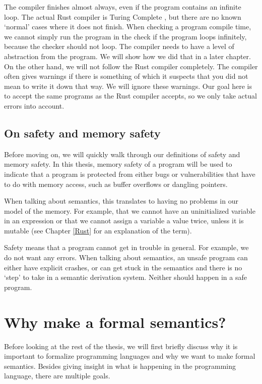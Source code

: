 The compiler finishes almost always, even if the program contains an infinite loop. The actual Rust compiler is Turing Complete \citep{compiler}, but there are no known `normal' cases where it does not finish. When checking a program compile time, we cannot simply run the program in the check if the program loops infinitely, because the checker should not loop. The compiler needs to have a level of abstraction from the program. We will show how we did that in a later chapter. On the other hand, we will not follow the Rust compiler completely. The compiler often gives warnings if there is something of which it suspects that you did not mean to write it down that way. We will ignore these warnings. Our goal here is to accept the same programs as the Rust compiler accepts, so we only take actual errors into account. 

\subsection{On safety and memory safety}
Before moving on, we will quickly walk through our definitions of safety and memory safety. In this thesis, memory safety of a program will be used to indicate that a program is protected from either bugs or vulnerabilities that have to do with memory access, such as buffer overflows or dangling pointers. 

When talking about semantics, this translates to having no problems in our model of the memory. For example, that we cannot have an uninitialized variable in an expression or that we cannot assign a variable a value twice, unless it is mutable (see Chapter \ref{Rust} for an explanation of the term). 

Safety means that a program cannot get in trouble in general. For example, we do not want any errors. When talking about semantics, an unsafe program can either have explicit crashes, or can get stuck in the semantics and there is no `step' to take in a semantic derivation system. Neither should happen in a safe program. 

\section[Why formal semantics]{Why make a formal semantics?}
Before looking at the rest of the thesis, we will first briefly discuss why it is important to formalize programming languages and why we want to make formal semantics. Besides giving insight in what is happening in the programming language, there are multiple goals.

